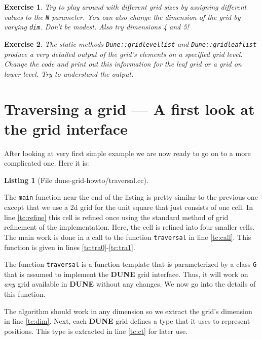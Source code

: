 \documentclass[11pt,a4paper,headinclude,footinclude,DIV16,normalheadings]{scrreprt}
\newcommand{\Dune}{{\sf\bfseries DUNE}\xspace}
\newtheorem{exc}{Exercise}[chapter]
\newtheorem{lst}{Listing}
\begin{document}
\begin{exc} Try to play around with different grid sizes by assigning
  different values to the \lstinline!N! parameter. You can also change
  the dimension of the grid by varying \lstinline!dim!. Don't be
  modest. Also try dimensions 4 and 5!
\end{exc}

\begin{exc} 
  The static methods \lstinline!Dune::gridlevellist! and
  \lstinline!Dune::gridleaflist! produce a very detailed output of the grid's
  elements on a specified grid level. Change the code and print out this
  information for the leaf grid or a grid on lower level. Try to understand the
  output. 
\end{exc}

\section{Traversing a grid --- A first look at the grid interface}

After looking at very first simple example we are now ready to go on
to a more complicated one. Here it is:

\begin{lst}[File dune-grid-howto/traversal.cc] \mbox{}
\nopagebreak

\end{lst}

The \lstinline!main! function near the end of the listing is pretty
similar to the previous one except that we use a 2d grid for the unit
square that just consists of one cell. In line \ref{tc:refine} this
cell is refined once using the standard method of grid refinement of
the implementation. Here, the cell is refined into four smaller cells.
The main work is done in a call to the function \lstinline!traversal!
in line \ref{tc:call}.  This function is given in lines
\ref{tc:tra0}-\ref{tc:tra1}.

The function \lstinline!traversal! is a function template that is
parameterized by a class \lstinline!G! that is assumed to implement
the \Dune{} grid interface.  Thus, it will work on \textit{any} grid
available in \Dune{} without any changes. We now go into the details
of this function.

The algorithm should work in any dimension so we extract the grid's
dimension in line \ref{tc:dim}. Next, each \Dune{} grid defines a type
that it uses to represent positions. This type is extracted in line
\ref{tc:ct} for later use.
\end{document}
